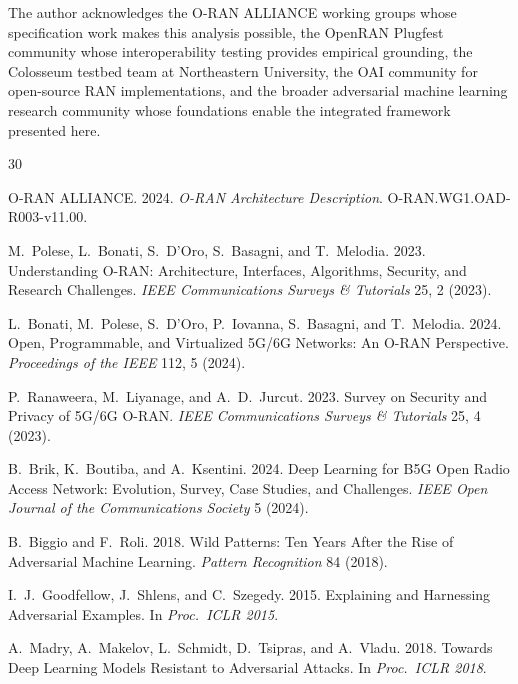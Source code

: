 \documentclass[sigconf,nonacm]{acmart}
\begin{document}
\begin{acks}
The author acknowledges the O-RAN ALLIANCE working groups whose
specification work makes this analysis possible, the OpenRAN
Plugfest community whose interoperability testing provides
empirical grounding, the Colosseum testbed team at Northeastern
University, the OAI community for open-source RAN implementations,
and the broader adversarial machine learning research community
whose foundations enable the integrated framework presented here.
\end{acks}

\sloppy

\begin{thebibliography}{30}

O-RAN ALLIANCE. 2024. \textit{O-RAN Architecture Description}.
O-RAN.WG1.OAD-R003-v11.00.

M.~Polese, L.~Bonati, S.~D'Oro, S.~Basagni, and T.~Melodia. 2023.
Understanding O-RAN: Architecture, Interfaces, Algorithms,
Security, and Research Challenges. \textit{IEEE Communications
Surveys \& Tutorials} 25, 2 (2023).

L.~Bonati, M.~Polese, S.~D'Oro, P.~Iovanna, S.~Basagni, and
T.~Melodia. 2024. Open, Programmable, and Virtualized 5G/6G
Networks: An O-RAN Perspective. \textit{Proceedings of the IEEE}
112, 5 (2024).

P.~Ranaweera, M.~Liyanage, and A.~D.~Jurcut. 2023. Survey on
Security and Privacy of 5G/6G O-RAN. \textit{IEEE Communications
Surveys \& Tutorials} 25, 4 (2023).

B.~Brik, K.~Boutiba, and A.~Ksentini. 2024. Deep Learning for
B5G Open Radio Access Network: Evolution, Survey, Case Studies,
and Challenges. \textit{IEEE Open Journal of the Communications
Society} 5 (2024).

B.~Biggio and F.~Roli. 2018. Wild Patterns: Ten Years After the
Rise of Adversarial Machine Learning. \textit{Pattern Recognition}
84 (2018).

I.~J.~Goodfellow, J.~Shlens, and C.~Szegedy. 2015. Explaining and
Harnessing Adversarial Examples. In \textit{Proc.\ ICLR 2015}.

A.~Madry, A.~Makelov, L.~Schmidt, D.~Tsipras, and A.~Vladu. 2018.
Towards Deep Learning Models Resistant to Adversarial Attacks.
In \textit{Proc.\ ICLR 2018}.


\end{thebibliography}
\end{document}
